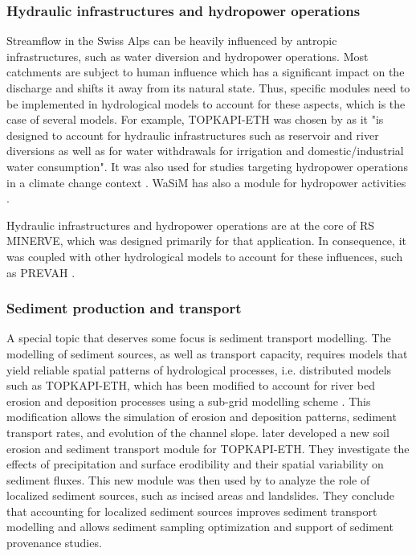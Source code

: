 \documentclass[10pt,a4paper]{article}
\begin{document}
\subsubsection{Hydraulic infrastructures and hydropower operations}
\label{sec:application:infrastructures}

Streamflow in the Swiss Alps can be heavily influenced by antropic infrastructures, such as water diversion and hydropower operations. Most catchments are subject to human influence which has a significant impact on the discharge and shifts it away from its natural state. Thus, specific modules need to be implemented in hydrological models to account for these aspects, which is the case of several models. For example, TOPKAPI-ETH was chosen by \citet{Fatichi2014} as it "is designed to account for hydraulic infrastructures such as reservoir and river diversions as well as for water withdrawals for irrigation and domestic/industrial water consumption". It was also used for studies targeting hydropower operations in a climate change context \citep{Fatichi2015, Anghileri2018}. WaSiM has also a module for hydropower activities \citep{Verbunt2005}.

Hydraulic infrastructures and hydropower operations are at the core of RS MINERVE, which was designed primarily for that application. In consequence, it was coupled with other hydrological models to account for these influences, such as PREVAH \citep{Andres2016, Stucki2018}.
 

\subsubsection{Sediment production and transport}
\label{sec:application:sediments}

A special topic that deserves some focus is sediment transport modelling. The modelling of sediment sources, as well as transport capacity, requires models that yield reliable spatial patterns of hydrological processes, i.e. distributed models such as TOPKAPI-ETH, which has been modified to account for river bed erosion and deposition processes using a sub-grid modelling scheme \citep{Konz2011}. This modification allows the simulation of erosion and deposition patterns, sediment transport rates, and evolution of the channel slope. \citet{Battista2020a} later developed a new soil erosion and sediment transport module for TOPKAPI-ETH. They investigate the effects of precipitation and surface erodibility and their spatial variability on sediment fluxes. This new module was then used by \citet{Battista2020} to analyze the role of localized sediment sources, such as incised areas and landslides. They conclude that accounting for localized sediment sources improves sediment transport modelling and allows sediment sampling optimization and support of sediment provenance studies.
\end{document}

